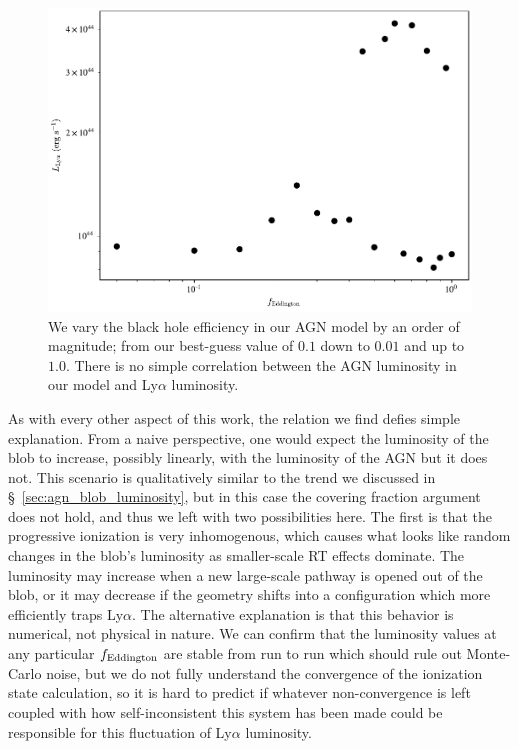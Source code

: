 \begin{figure}
    \centering
    \includegraphics[width=\textwidth,keepaspectratio]{figures/eddington_grid.pdf}
    \caption{
        We vary the black hole efficiency in our AGN model by an order of magnitude; from our best-guess value of $0.1$ down to $0.01$ and up to $1.0$.
        There is no simple correlation between the AGN luminosity in our model and Ly$\alpha$ luminosity.
    }
    \label{fig:eddington_grid}
\end{figure}

As with every other aspect of this work, the relation we find defies simple explanation.
From a naive perspective, one would expect the luminosity of the blob to increase, possibly linearly, with the luminosity of the AGN but it does not.
This scenario is qualitatively similar to the trend we discussed in \S~\ref{sec:agn_blob_luminosity}, but in this case the covering fraction argument does not hold, and thus we left with two possibilities here.
The first is that the progressive ionization is very inhomogenous, which causes what looks like random changes in the blob's luminosity as smaller-scale RT effects dominate.
The luminosity may increase when a new large-scale pathway is opened out of the blob, or it may decrease if the geometry shifts into a configuration which more efficiently traps Ly$\alpha$.
The alternative explanation is that this behavior is numerical, not physical in nature.
We can confirm that the luminosity values at any particular $f_{\rm{Eddington}}$ are stable from run to run which should rule out Monte-Carlo noise, but we do not fully understand the convergence of the ionization state calculation, so it is hard to predict if whatever non-convergence is left coupled with how self-inconsistent this system has been made could be responsible for this fluctuation of Ly$\alpha$ luminosity.
